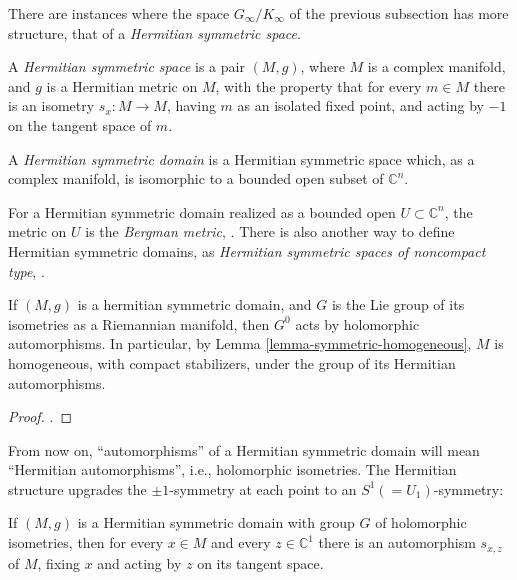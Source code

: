 There are instances where the space $G_\infty/K_\infty$ of the previous subsection has more structure, that of a \emph{Hermitian symmetric space}. 

\begin{definition}
 \label{definition-hermitian-symmetric}
A {\it Hermitian symmetric space} is a pair $(M,g)$, where $M$ is a complex manifold, and $g$ is a Hermitian metric on $M$, with the property that for every $m\in M$ there is an isometry $s_x:M\to M$, having $m$ as an isolated fixed point, and acting by $-1$ on the tangent space of $m$. 

A {\it Hermitian symmetric domain} is a Hermitian symmetric space which, as a complex manifold, is isomorphic to a bounded open subset of $\mathbb C^n$. 
\end{definition}

\begin{remark}
 \label{remark-Bergman-metric}
For a Hermitian symmetric domain realized as a bounded open $U\subset \mathbb C^n$, the metric on $U$ is the {\it Bergman metric}, \cite[Theorem 1.3]{Milne-Shimura}. There is also another way to define Hermitian symmetric domains, as {\it Hermitian symmetric spaces of noncompact type}, \cite[\S 1]{Milne-Shimura}.
\end{remark}


\begin{lemma}
 \label{lemma-hermitian-homogeneous}
If $(M,g)$ is a hermitian symmetric domain, and $G$ is the Lie group of its isometries as a Riemannian manifold, then $G^0$ acts by holomorphic automorphisms. In particular, by Lemma \ref{lemma-symmetric-homogeneous}, $M$ is homogeneous, with compact stabilizers, under the group of its Hermitian automorphisms.
\end{lemma}

\begin{proof}
 \cite[Proposition 1.6]{Milne-Shimura}.
\end{proof}

From now on, ``automorphisms'' of a Hermitian symmetric domain will mean ``Hermitian automorphisms'', i.e., holomorphic isometries.
The Hermitian structure upgrades the $\pm 1$-symmetry at each point to an $S^1(=U_1)$-symmetry:

\begin{lemma}
 \label{lemma-S1-symmetry}
If $(M,g)$ is a Hermitian symmetric domain with group $G$ of holomorphic isometries, then for every $x\in M$ and every $z\in \mathbb C^1$ there is an automorphism $s_{x,z}$ of $M$, fixing $x$ and acting by $z$ on its tangent space.
\end{lemma}

